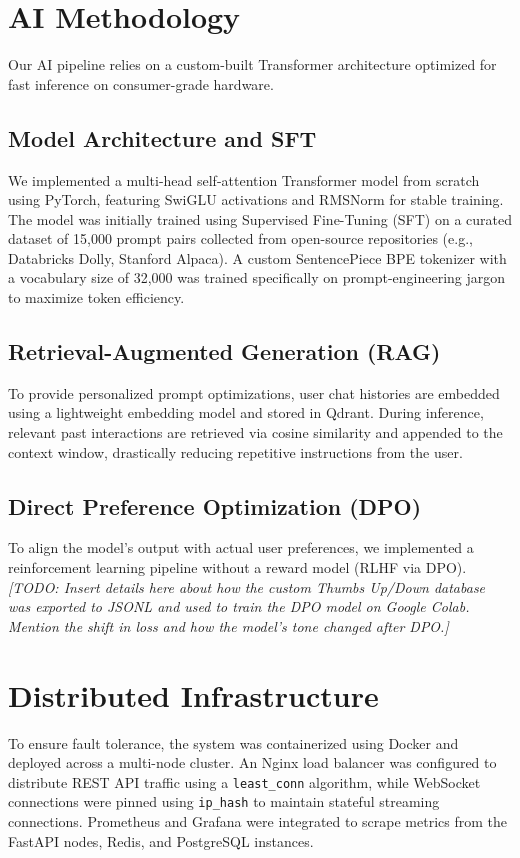 \documentclass[10pt, conference]{IEEEtran}
\begin{document}
\section{AI Methodology}
Our AI pipeline relies on a custom-built Transformer architecture optimized for fast inference on consumer-grade hardware.

\subsection{Model Architecture and SFT}
We implemented a multi-head self-attention Transformer model from scratch using PyTorch, featuring SwiGLU activations and RMSNorm for stable training. The model was initially trained using Supervised Fine-Tuning (SFT) on a curated dataset of 15,000 prompt pairs collected from open-source repositories (e.g., Databricks Dolly, Stanford Alpaca). A custom SentencePiece BPE tokenizer with a vocabulary size of 32,000 was trained specifically on prompt-engineering jargon to maximize token efficiency.

\subsection{Retrieval-Augmented Generation (RAG)}
To provide personalized prompt optimizations, user chat histories are embedded using a lightweight embedding model and stored in Qdrant. During inference, relevant past interactions are retrieved via cosine similarity and appended to the context window, drastically reducing repetitive instructions from the user.

\subsection{Direct Preference Optimization (DPO)}
To align the model's output with actual user preferences, we implemented a reinforcement learning pipeline without a reward model (RLHF via DPO). 
\textit{[TODO: Insert details here about how the custom Thumbs Up/Down database was exported to JSONL and used to train the DPO model on Google Colab. Mention the shift in loss and how the model's tone changed after DPO.]}

\section{Distributed Infrastructure}
To ensure fault tolerance, the system was containerized using Docker and deployed across a multi-node cluster. An Nginx load balancer was configured to distribute REST API traffic using a \texttt{least\_conn} algorithm, while WebSocket connections were pinned using \texttt{ip\_hash} to maintain stateful streaming connections. Prometheus and Grafana were integrated to scrape metrics from the FastAPI nodes, Redis, and PostgreSQL instances.
\end{document}
